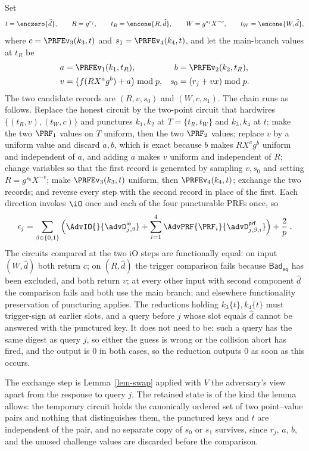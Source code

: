 Set
$$
t = \enczero{\widehat d},
\qquad
R = g^{r_j},
\qquad
t_R = \encone{R,\widehat d},
\qquad
W = g^{s_1}X^{-c},
\qquad
t_W = \encone{W,\widehat d},
$$
where $c = \PRFEv_3(k_3,t)$ and $s_1 = \PRFEv_4(k_4,t)$, and let the main-branch values at $t_R$ be
$$
\begin{aligned}
a &= \PRFEv_1(k_1,t_R),
& b &= \PRFEv_2(k_2,t_R),\\
v &= \big(f(RX^{a}g^{b})+a\big)\bmod p,
& s_0 &= (r_j + vx)\bmod p.
\end{aligned}
$$
The two candidate records are $(R,v,s_0)$ and $(W,c,s_1)$. The chain runs as follows. Replace the honest circuit by the two-point circuit that hardwires $\{(t_R,v),(t_W,c)\}$ and punctures $k_1,k_2$ at $T = \{t_R,t_W\}$ and $k_3,k_4$ at $t$; make the two $\PRF_1$ values on $T$ uniform, then the two $\PRF_2$ values; replace $v$ by a uniform value and discard $a,b$, which is exact because $b$ makes $RX^{a}g^{b}$ uniform and independent of $a$, and adding $a$ makes $v$ uniform and independent of $R$; change variables so that the first record is generated by sampling $v,s_0$ and setting $R = g^{s_0}X^{-v}$; make $\PRFEv_3(k_3,t)$ uniform, then $\PRFEv_4(k_4,t)$; exchange the two records; and reverse every step with the second record in place of the first. Each direction invokes $\iO$ once and each of the four puncturable PRFs once, so
$$
\epsilon_j
=
\sum_{\beta\in\{0,1\}}
\Big(
\AdvIO{}{\advD^{\mathsf{io}}_{j,\beta}}
+\sum_{i=1}^{4}\AdvPRF{\PRF_i}{\advD^{\mathsf{prf}}_{j,\beta,i}}
\Big)
+\frac{2}{p} \;.
$$
The circuits compared at the two iO steps are functionally equal: on input $(W,\widehat d)$ both return $c$; on $(R,\widehat d)$ the trigger comparison fails because $\mathsf{Bad}_{\mathsf{eq}}$ has been excluded, and both return $v$; at every other input with second component $\widehat d$ the comparison fails and both use the main branch; and elsewhere functionality preservation of puncturing applies. The reductions holding $k_3\{t\},k_4\{t\}$ must trigger-sign at earlier slots, and a query before $j$ whose slot equals $\widehat d$ cannot be answered with the punctured key. It does not need to be: such a query has the same digest as query $j$, so either the guess is wrong or the collision abort has fired, and the output is 0 in both cases, so the reduction outputs 0 as soon as this occurs.

The exchange step is Lemma~\ref{lem-swap} applied with $V$ the adversary's view apart from the response to query $j$. The retained state is of the kind the lemma allows: the temporary circuit holds the canonically ordered set of two point--value pairs and nothing that distinguishes them, the punctured keys and $t$ are independent of the pair, and no separate copy of $s_0$ or $s_1$ survives, since $r_j$, $a$, $b$, and the unused challenge values are discarded before the comparison.


